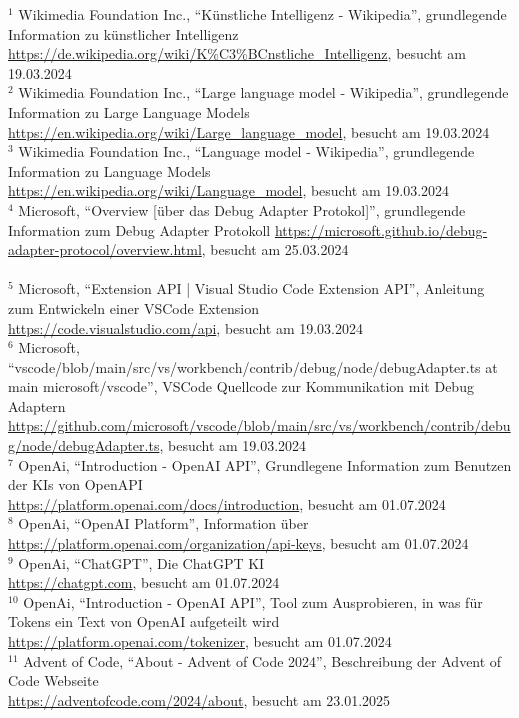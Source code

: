 \documentclass[a4paper,12pt,ngerman]{scrartcl}
\begin{document}
$^1$ Wikimedia Foundation Inc.,  ``Künstliche Intelligenz - Wikipedia'', grundlegende Information zu künstlicher Intelligenz\\
\url{https://de.wikipedia.org/wiki/K\%C3\%BCnstliche_Intelligenz}, besucht am 19.03.2024\\
$^2$ Wikimedia Foundation Inc.,  ``Large language model - Wikipedia'', grundlegende Information zu Large Language Models\\
\url{https://en.wikipedia.org/wiki/Large_language_model}, besucht am 19.03.2024\\
$^3$ Wikimedia Foundation Inc.,  ``Language model - Wikipedia'', grundlegende Information zu Language Models \\
\url{https://en.wikipedia.org/wiki/Language_model}, besucht am 19.03.2024\\
$^4$ Microsoft, ``Overview [über das Debug Adapter Protokol]'', grundlegende Information zum Debug Adapter Protokoll
\url{https://microsoft.github.io/debug-adapter-protocol/overview.html}, besucht am 25.03.2024\\
\vspace{1em}\\
$^5$ Microsoft, ``Extension API | Visual Studio Code Extension API'', Anleitung zum Entwickeln einer VSCode Extension\\
\url{https://code.visualstudio.com/api}, besucht am 19.03.2024\\
$^6$ Microsoft, ``vscode/blob/main/src/vs/workbench/contrib/debug/node/debugAdapter.ts at main microsoft/vscode'', VSCode Quellcode zur Kommunikation mit Debug Adaptern\\
\url{https://github.com/microsoft/vscode/blob/main/src/vs/workbench/contrib/debug/node/debugAdapter.ts}, besucht am 19.03.2024\\
$^7$ OpenAi, ``Introduction - OpenAI API'', Grundlegene Information zum Benutzen der KIs von OpenAPI\\
\url {https://platform.openai.com/docs/introduction}, besucht am 01.07.2024\\
$^8$ OpenAi, ``OpenAI Platform'', Information über\\
\url {https://platform.openai.com/organization/api-keys}, besucht am 01.07.2024\\
$^9$ OpenAi, ``ChatGPT'', Die ChatGPT KI\\
\url {https://chatgpt.com}, besucht am 01.07.2024\\
$^{10}$ OpenAi, ``Introduction - OpenAI API'', Tool zum Ausprobieren, in was für Tokens ein Text von OpenAI aufgeteilt wird\\
\url {https://platform.openai.com/tokenizer}, besucht am 01.07.2024\\
$^{11}$ Advent of Code, ``About - Advent of Code 2024'', Beschreibung der Advent of Code Webseite\\
\url {https://adventofcode.com/2024/about}, besucht am 23.01.2025\\
\end{document}
